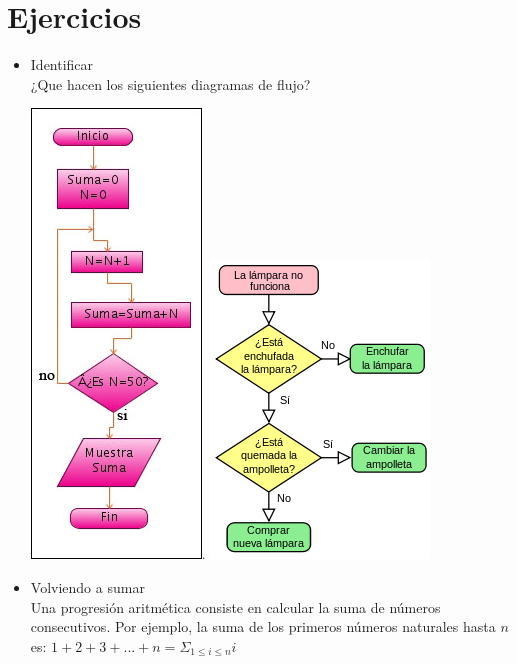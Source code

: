 
\section*{Ejercicios}

\begin{itemize}
    \item Identificar\\
        ¿Que hacen los siguientes diagramas de flujo?
          \begin{center}
            \includegraphics[scale=0.5]{Imagenes/image11}.
            \includegraphics[scale=0.8]{Imagenes/image03}
          \end{center}

    \item Volviendo a sumar\\
        Una progresión aritmética consiste en calcular la suma de números consecutivos. Por ejemplo, la suma de los primeros números naturales hasta $n$ es:
        $1 + 2 + 3 + ... + n = \Sigma_{1\leq i\leq n}i$
        

\end{itemize}
